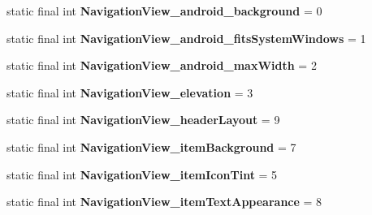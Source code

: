 \begin{DoxyCompactItemize}
\item 
\hypertarget{classandroid_1_1support_1_1design_1_1_r_1_1styleable_a1774b647af0eb6637aea1d2b9ac5d9eb}{}static final int {\bfseries Navigation\+View\+\_\+android\+\_\+background} = 0\label{classandroid_1_1support_1_1design_1_1_r_1_1styleable_a1774b647af0eb6637aea1d2b9ac5d9eb}

\item 
\hypertarget{classandroid_1_1support_1_1design_1_1_r_1_1styleable_ab02ea2b7f96484c64a3ebd95e5e2369d}{}static final int {\bfseries Navigation\+View\+\_\+android\+\_\+fits\+System\+Windows} = 1\label{classandroid_1_1support_1_1design_1_1_r_1_1styleable_ab02ea2b7f96484c64a3ebd95e5e2369d}

\item 
\hypertarget{classandroid_1_1support_1_1design_1_1_r_1_1styleable_ad1d7cfceea7a309d841cd3db426f7f4c}{}static final int {\bfseries Navigation\+View\+\_\+android\+\_\+max\+Width} = 2\label{classandroid_1_1support_1_1design_1_1_r_1_1styleable_ad1d7cfceea7a309d841cd3db426f7f4c}

\item 
\hypertarget{classandroid_1_1support_1_1design_1_1_r_1_1styleable_a701f3045d0bea3a251d0ea6d82edf2ad}{}static final int {\bfseries Navigation\+View\+\_\+elevation} = 3\label{classandroid_1_1support_1_1design_1_1_r_1_1styleable_a701f3045d0bea3a251d0ea6d82edf2ad}

\item 
\hypertarget{classandroid_1_1support_1_1design_1_1_r_1_1styleable_a4e6b4e11c802a6a9013ba362fd46e781}{}static final int {\bfseries Navigation\+View\+\_\+header\+Layout} = 9\label{classandroid_1_1support_1_1design_1_1_r_1_1styleable_a4e6b4e11c802a6a9013ba362fd46e781}

\item 
\hypertarget{classandroid_1_1support_1_1design_1_1_r_1_1styleable_ae51d9828828f318e95b0513f0432ca4c}{}static final int {\bfseries Navigation\+View\+\_\+item\+Background} = 7\label{classandroid_1_1support_1_1design_1_1_r_1_1styleable_ae51d9828828f318e95b0513f0432ca4c}

\item 
\hypertarget{classandroid_1_1support_1_1design_1_1_r_1_1styleable_a2dbe4842476f6cbd848e05031cd5d92f}{}static final int {\bfseries Navigation\+View\+\_\+item\+Icon\+Tint} = 5\label{classandroid_1_1support_1_1design_1_1_r_1_1styleable_a2dbe4842476f6cbd848e05031cd5d92f}

\item 
\hypertarget{classandroid_1_1support_1_1design_1_1_r_1_1styleable_af3af58f69e672c5e0c03df4c759b7c43}{}static final int {\bfseries Navigation\+View\+\_\+item\+Text\+Appearance} = 8\label{classandroid_1_1support_1_1design_1_1_r_1_1styleable_af3af58f69e672c5e0c03df4c759b7c43}


\end{DoxyCompactItemize}
